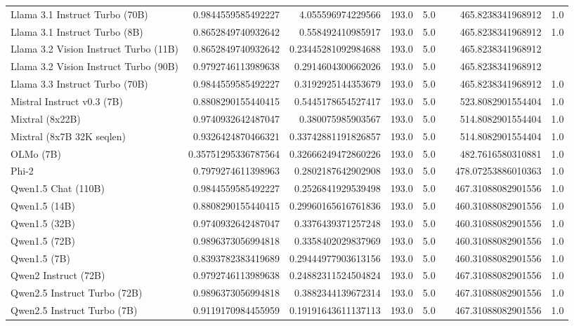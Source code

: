 \begin{table}[htp]
{\begin{tabular}{lrrrrrrr}
Llama 3.1 Instruct Turbo (70B) & 0.9844559585492227 & 4.055596974229566 & 193.0 & 5.0 &  & 465.8238341968912 & 1.0 \\
Llama 3.1 Instruct Turbo (8B) & 0.8652849740932642 & 0.558492410985917 & 193.0 & 5.0 &  & 465.8238341968912 & 1.0 \\
Llama 3.2 Vision Instruct Turbo (11B) & 0.8652849740932642 & 0.23445281092984688 & 193.0 & 5.0 &  & 465.8238341968912 &  \\
Llama 3.2 Vision Instruct Turbo (90B) & 0.9792746113989638 & 0.2914604300662026 & 193.0 & 5.0 &  & 465.8238341968912 &  \\
Llama 3.3 Instruct Turbo (70B) & 0.9844559585492227 & 0.3192925144353679 & 193.0 & 5.0 &  & 465.8238341968912 & 1.0 \\
Mistral Instruct v0.3 (7B) & 0.8808290155440415 & 0.5445178654527417 & 193.0 & 5.0 &  & 523.8082901554404 & 1.0 \\
Mixtral (8x22B) & 0.9740932642487047 & 0.380075985903567 & 193.0 & 5.0 &  & 514.8082901554404 & 1.0 \\
Mixtral (8x7B 32K seqlen) & 0.9326424870466321 & 0.33742881191826857 & 193.0 & 5.0 &  & 514.8082901554404 & 1.0 \\
OLMo (7B) & 0.35751295336787564 & 0.32666249472860226 & 193.0 & 5.0 &  & 482.7616580310881 & 1.0 \\
Phi-2 & 0.7979274611398963 & 0.2802187642902908 & 193.0 & 5.0 &  & 478.07253886010363 & 1.0 \\
Qwen1.5 Chat (110B) & 0.9844559585492227 & 0.2526841929539498 & 193.0 & 5.0 &  & 467.31088082901556 & 1.0 \\
Qwen1.5 (14B) & 0.8808290155440415 & 0.29960165616761836 & 193.0 & 5.0 &  & 460.31088082901556 & 1.0 \\
Qwen1.5 (32B) & 0.9740932642487047 & 0.3376439371257248 & 193.0 & 5.0 &  & 460.31088082901556 & 1.0 \\
Qwen1.5 (72B) & 0.9896373056994818 & 0.3358402029837969 & 193.0 & 5.0 &  & 460.31088082901556 & 1.0 \\
Qwen1.5 (7B) & 0.8393782383419689 & 0.29444977903613156 & 193.0 & 5.0 &  & 460.31088082901556 & 1.0 \\
Qwen2 Instruct (72B) & 0.9792746113989638 & 0.24882311524504824 & 193.0 & 5.0 &  & 467.31088082901556 & 1.0 \\
Qwen2.5 Instruct Turbo (72B) & 0.9896373056994818 & 0.3882344139672314 & 193.0 & 5.0 &  & 467.31088082901556 & 1.0 \\
Qwen2.5 Instruct Turbo (7B) & 0.9119170984455959 & 0.19191643611137113 & 193.0 & 5.0 &  & 467.31088082901556 & 1.0 \\

\end{tabular}}
\end{table}
